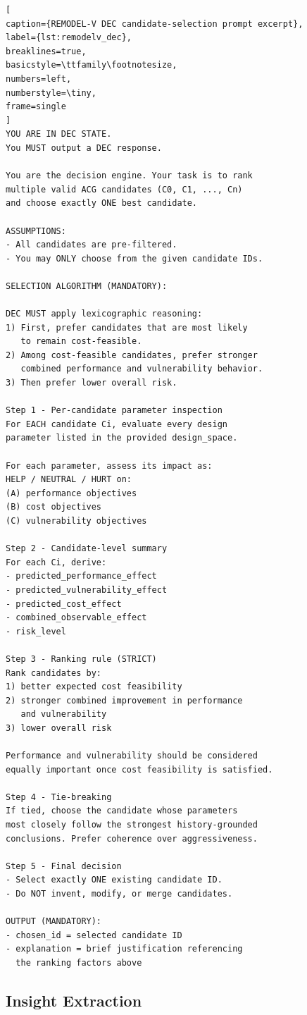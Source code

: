 \begin{lstlisting}[
caption={REMODEL-V DEC candidate-selection prompt excerpt},
label={lst:remodelv_dec},
breaklines=true,
basicstyle=\ttfamily\footnotesize,
numbers=left,
numberstyle=\tiny,
frame=single
]
YOU ARE IN DEC STATE.
You MUST output a DEC response.

You are the decision engine. Your task is to rank
multiple valid ACG candidates (C0, C1, ..., Cn)
and choose exactly ONE best candidate.

ASSUMPTIONS:
- All candidates are pre-filtered.
- You may ONLY choose from the given candidate IDs.

SELECTION ALGORITHM (MANDATORY):

DEC MUST apply lexicographic reasoning:
1) First, prefer candidates that are most likely
   to remain cost-feasible.
2) Among cost-feasible candidates, prefer stronger
   combined performance and vulnerability behavior.
3) Then prefer lower overall risk.

Step 1 - Per-candidate parameter inspection
For EACH candidate Ci, evaluate every design
parameter listed in the provided design_space.

For each parameter, assess its impact as:
HELP / NEUTRAL / HURT on:
(A) performance objectives
(B) cost objectives
(C) vulnerability objectives

Step 2 - Candidate-level summary
For each Ci, derive:
- predicted_performance_effect
- predicted_vulnerability_effect
- predicted_cost_effect
- combined_observable_effect
- risk_level

Step 3 - Ranking rule (STRICT)
Rank candidates by:
1) better expected cost feasibility
2) stronger combined improvement in performance
   and vulnerability
3) lower overall risk

Performance and vulnerability should be considered
equally important once cost feasibility is satisfied.

Step 4 - Tie-breaking
If tied, choose the candidate whose parameters
most closely follow the strongest history-grounded
conclusions. Prefer coherence over aggressiveness.

Step 5 - Final decision
- Select exactly ONE existing candidate ID.
- Do NOT invent, modify, or merge candidates.

OUTPUT (MANDATORY):
- chosen_id = selected candidate ID
- explanation = brief justification referencing
  the ranking factors above
\end{lstlisting}

\subsection{Insight Extraction}
\label{app:remodelv_prompts_ins}


